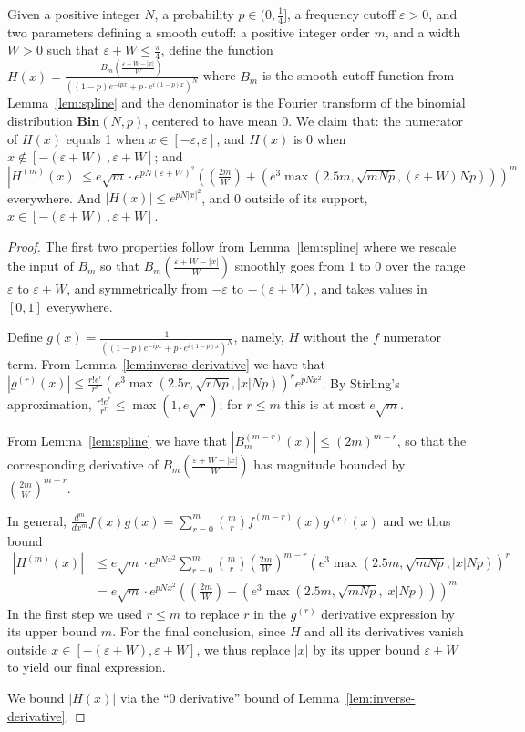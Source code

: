 \documentclass[11pt]{article}
\theoremstyle{plain}
\newcommand{\Bin}[2]{\textbf{Bin}(#1,#2)}
\newcommand{\eps}{\varepsilon}
\begin{document}
\begin{lemma}\label{lem:H-def}
Given a positive integer $N$, a probability $p\in (0,\frac{1}{4}]$, a frequency cutoff $\eps>0$, and two parameters defining a smooth cutoff: a positive integer order $m$, and a width $W>0$ such that $\eps+W\leq\frac{\pi}{4}$, define the function $H(x)=\frac{B_m(\frac{\eps+W-|x|}{W})}{((1-p)e^{-i p x}+p\cdot e^{i (1-p)x})^N}$ where $B_m$ is the smooth cutoff function from Lemma~\ref{lem:spline} and the denominator is the Fourier transform of the binomial distribution $\Bin{N}{p}$, centered to have mean 0. We claim that: the numerator of $H(x)$ equals 1 when $x\in[-\eps,\eps]$, and $H(x)$ is 0 when $x\notin [-(\eps+W)\,,\eps+W]$; and $|H^{(m)}(x)|\leq e\sqrt{m}\cdot e^{pN(\eps+W)^2} \left((\frac{2m}{W})+(e^3\max(2.5 m,\sqrt{mNp},(\eps+W) Np))\right)^m$ everywhere. And $|H(x)|\leq e^{pN|x|^2}$, and 0 outside of its support, $x\in[-(\eps+W)\,,\eps+W]$.
\end{lemma}

\begin{proof}
The first two properties follow from Lemma~\ref{lem:spline} where we rescale the input of $B_m$ so that $B_m(\frac{\eps+W-|x|}{W})$ smoothly goes from 1 to 0 over the range $\eps$ to $\eps+W$, and symmetrically from $-\eps$ to $-(\eps+W)$, and takes values in $[0,1]$ everywhere.

Define $g(x)=\frac{1}{((1-p)e^{-i p x}+p\cdot e^{i (1-p)x})^N}$, namely, $H$ without the $f$ numerator term.
From Lemma~\ref{lem:inverse-derivative} we have that $|g^{(r)}(x)|\leq\frac{r!e^r}{r^r}(e^3\max(2.5 r,\sqrt{rNp},|x|Np))^{r}e^{pNx^2}$. By Stirling's approximation, $\frac{r!e^r}{r^r}\leq \max(1,e\sqrt{r})$; for $r\leq m$ this is at most $e\sqrt{m}$.



From Lemma~\ref{lem:spline} we have that $|B_m^{(m-r)}(x)|\leq (2m)^{m-r}$, so that the corresponding derivative of $B_m(\frac{\eps+W-|x|}{W})$ has magnitude bounded by $(\frac{2m}{W})^{m-r}$. 

In general, $\frac{d^m}{dx^m} f(x)g(x)=\sum_{r=0}^m \binom{m}{r}f^{(m-r)}(x)g^{(r)}(x)$ and we thus bound 
\begin{align*}|H^{(m)}(x)| &\leq e\sqrt{m}\cdot e^{pNx^2} \sum_{r=0}^m \binom{m}{r}(\frac{2m}{W})^{m-r}(e^3\max(2.5 m,\sqrt{mNp},|x|Np))^{r}\\
&=e\sqrt{m}\cdot e^{pNx^2} \left((\frac{2m}{W})+(e^3\max(2.5 m,\sqrt{mNp},|x|Np))\right)^m\end{align*}
In the first step we used $r\leq m$ to replace $r$ in the $g^{(r)}$ derivative expression by its upper bound $m$. For the final conclusion, since $H$ and all its derivatives vanish outside $x\in[-(\eps+W),\eps+W]$, we thus replace $|x|$ by its upper bound $\eps+W$ to yield our final expression.

We bound $|H(x)|$ via the ``0 derivative'' bound of Lemma~\ref{lem:inverse-derivative}.
\end{proof}
\end{document}
